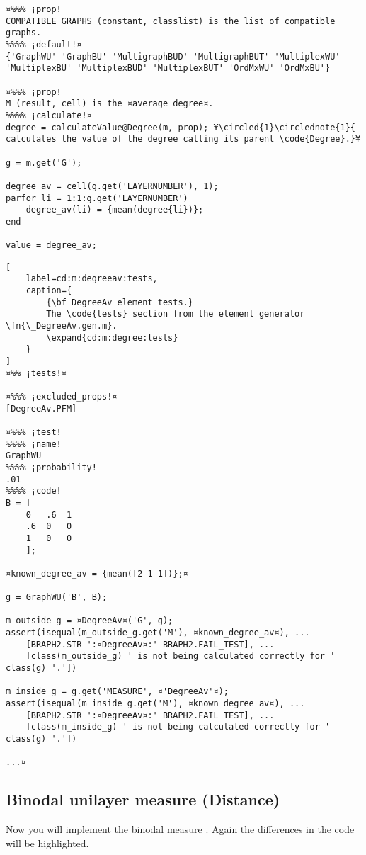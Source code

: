\documentclass{tufte-handout}
\begin{document}
\begin{lstlisting}
¤%%% ¡prop!
COMPATIBLE_GRAPHS (constant, classlist) is the list of compatible graphs.
%%%% ¡default!¤
{'GraphWU' 'GraphBU' 'MultigraphBUD' 'MultigraphBUT' 'MultiplexWU' 'MultiplexBU' 'MultiplexBUD' 'MultiplexBUT' 'OrdMxWU' 'OrdMxBU'}

¤%%% ¡prop!
M (result, cell) is the ¤average degree¤.
%%%% ¡calculate!¤
degree = calculateValue@Degree(m, prop); ¥\circled{1}\circlednote{1}{ calculates the value of the degree calling its parent \code{Degree}.}¥

g = m.get('G');

degree_av = cell(g.get('LAYERNUMBER'), 1);
parfor li = 1:1:g.get('LAYERNUMBER')
    degree_av(li) = {mean(degree{li})};
end

value = degree_av;
\end{lstlisting}

\begin{lstlisting}[
	label=cd:m:degreeav:tests,
	caption={
		{\bf DegreeAv element tests.}
		The \code{tests} section from the element generator \fn{\_DegreeAv.gen.m}.
		\expand{cd:m:degree:tests}
	}
]
¤%% ¡tests!¤

¤%%% ¡excluded_props!¤
[DegreeAv.PFM]

¤%%% ¡test!
%%%% ¡name!
GraphWU
%%%% ¡probability!
.01
%%%% ¡code!
B = [
    0   .6  1
    .6  0   0
    1   0   0
    ];

¤known_degree_av = {mean([2 1 1])};¤

g = GraphWU('B', B);

m_outside_g = ¤DegreeAv¤('G', g);
assert(isequal(m_outside_g.get('M'), ¤known_degree_av¤), ...
    [BRAPH2.STR ':¤DegreeAv¤:' BRAPH2.FAIL_TEST], ...
    [class(m_outside_g) ' is not being calculated correctly for ' class(g) '.'])

m_inside_g = g.get('MEASURE', ¤'DegreeAv'¤);
assert(isequal(m_inside_g.get('M'), ¤known_degree_av¤), ...
    [BRAPH2.STR ':¤DegreeAv¤:' BRAPH2.FAIL_TEST], ...
    [class(m_inside_g) ' is not being calculated correctly for ' class(g) '.'])

...¤
\end{lstlisting}

\clearpage

\subsection{Binodal unilayer measure (Distance)}

Now you will implement the binodal measure . 
{%
Again the differences in the code will be highlighted.
}%
\end{document}
